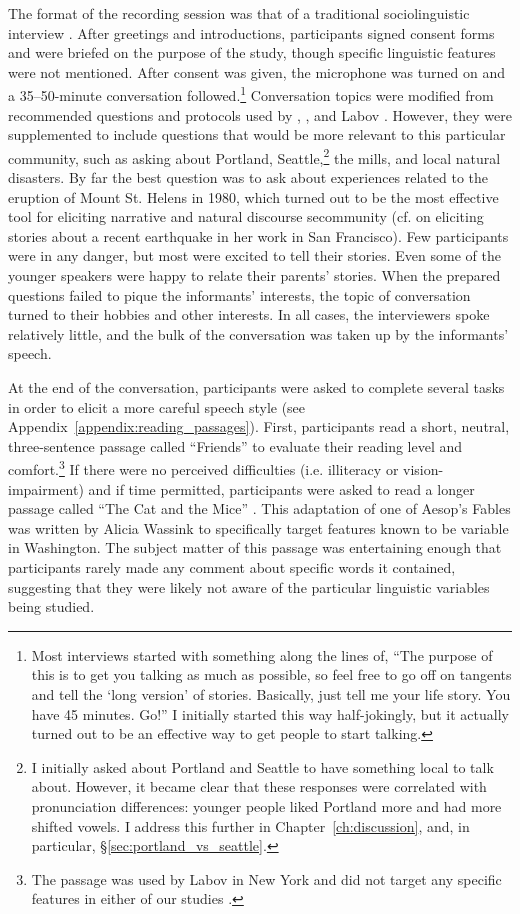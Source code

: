 The format of the recording session was that of a traditional sociolinguistic interview \citep{labov_1984}. After greetings and introductions, participants signed consent forms and were briefed on the purpose of the study, though specific linguistic features were not mentioned. After consent was given, the microphone was turned on and a 35--50-minute conversation followed.\footnote{Most interviews started with something along the lines of, ``The purpose of this is to get you talking as much as possible, so feel free to go off on tangents and tell the `long version' of stories. Basically, just tell me your life story. You have 45 minutes. Go!'' I initially started this way half-jokingly, but it actually turned out to be an effective way to get people to start talking.} Conversation topics were modified from recommended questions and protocols used by \citet{wolfram_1974}, \citet{tagliamonte_2006}, and Labov \citep{labov_1998_2004, labov_1984}. However, they were supplemented to include questions that would be more relevant to this particular community, such as asking about Portland, Seattle,\footnote{I initially asked about Portland and Seattle to have something local to talk about. However, it became clear that these responses were correlated with pronunciation differences: younger people liked Portland more and had more shifted vowels. I address this further in Chapter~\ref{ch:discussion}, and, in particular, \S\ref{sec:portland_vs_seattle}.} the mills, and local natural disasters. By far the best question was to ask about experiences related to the eruption of Mount St. Helens in 1980, which turned out to be the most effective tool for eliciting narrative and natural discourse secommunity (cf. \citealt[92]{moonwomon_1991_diss} on eliciting stories about a recent earthquake in her work in San Francisco). Few participants were in any danger, but most were excited to tell their stories. Even some of the younger speakers were happy to relate their parents' stories. When the prepared questions failed to pique the informants' interests, the topic of conversation turned to their hobbies and other interests. In all cases, the interviewers spoke relatively little, and the bulk of the conversation was taken up by the informants' speech.

At the end of the conversation, participants were asked to complete several tasks in order to elicit a more careful speech style (see Appendix~\ref{appendix:reading_passages}). First, participants read a short, neutral, three-sentence passage called ``Friends'' to evaluate their reading level and comfort.\footnote{The passage was used by Labov in New York and did not target any specific features in either of our studies \citep[417]{labov_2006}.} If there were no perceived difficulties (i.e. illiteracy or vision-impairment) and if time permitted, participants were asked to read a longer passage called ``The Cat and the Mice'' \citep{freeman_2014}. This adaptation of one of Aesop's Fables was written by Alicia Wassink to specifically target features known to be variable in Washington. The subject matter of this passage was entertaining enough that participants rarely made any comment about specific words it contained, suggesting that they were likely not aware of the particular linguistic variables being studied.

